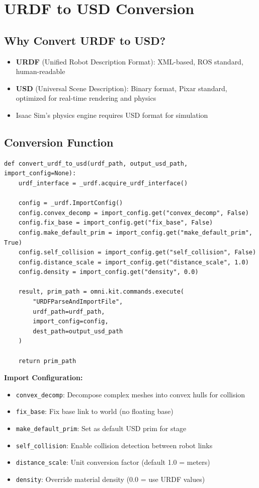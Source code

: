 \documentclass[11pt,a4paper]{article}
\begin{document}
\section{URDF to USD Conversion}

\subsection{Why Convert URDF to USD?}

\begin{itemize}
    \item \textbf{URDF} (Unified Robot Description Format): XML-based, ROS standard, human-readable
    \item \textbf{USD} (Universal Scene Description): Binary format, Pixar standard, optimized for real-time rendering and physics
    \item Isaac Sim's physics engine requires USD format for simulation
\end{itemize}

\subsection{Conversion Function}

\begin{lstlisting}
def convert_urdf_to_usd(urdf_path, output_usd_path, import_config=None):
    urdf_interface = _urdf.acquire_urdf_interface()
    
    config = _urdf.ImportConfig()
    config.convex_decomp = import_config.get("convex_decomp", False)
    config.fix_base = import_config.get("fix_base", False)
    config.make_default_prim = import_config.get("make_default_prim", True)
    config.self_collision = import_config.get("self_collision", False)
    config.distance_scale = import_config.get("distance_scale", 1.0)
    config.density = import_config.get("density", 0.0)
    
    result, prim_path = omni.kit.commands.execute(
        "URDFParseAndImportFile",
        urdf_path=urdf_path,
        import_config=config,
        dest_path=output_usd_path
    )
    
    return prim_path
\end{lstlisting}

\textbf{Import Configuration:}
\begin{itemize}
    \item \texttt{convex\_decomp}: Decompose complex meshes into convex hulls for collision
    \item \texttt{fix\_base}: Fix base link to world (no floating base)
    \item \texttt{make\_default\_prim}: Set as default USD prim for stage
    \item \texttt{self\_collision}: Enable collision detection between robot links
    \item \texttt{distance\_scale}: Unit conversion factor (default 1.0 = meters)
    \item \texttt{density}: Override material density (0.0 = use URDF values)
\end{itemize}
\end{document}
